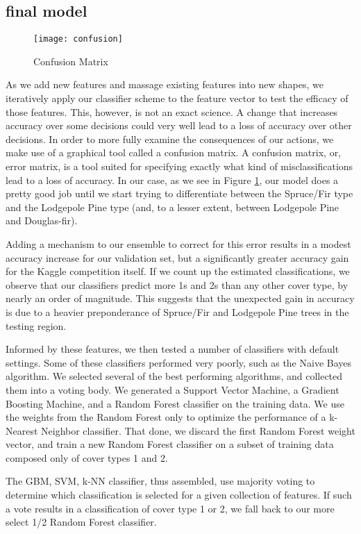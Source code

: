 \subsection{final model}

\begin{figure}[H]
  \texttt{[image: confusion]}
 \caption{Confusion Matrix}
 \label{fig:confusion}
\end{figure}

As we add new features and massage existing features into new shapes, 
we iteratively apply our classifier scheme to the feature vector to 
test the efficacy of those features.  This, however, is not an exact 
science.  A change that increases accuracy over some decisions could 
very well lead to a loss of accuracy over other decisions.  In order to 
more fully examine the consequences of our actions, we make use of a 
graphical tool called a confusion matrix\cite{stehman1997selecting}. A 
confusion matrix, or, error matrix, is a tool suited for specifying 
exactly what kind of misclassifications lead to a loss of accuracy.  
In our case, as we see in Figure \ref{fig:confusion}, our model does a 
pretty good job until we start trying to differentiate between the 
Spruce/Fir type and the Lodgepole Pine type (and, to a lesser extent, 
between Lodgepole Pine and Douglas-fir).  

Adding a mechanism to our ensemble to correct for this error results in 
a modest accuracy increase for our validation set, but a significantly 
greater accuracy gain for the Kaggle competition itself.  If we count 
up the estimated classifications, we observe that our classifiers 
predict more 1s and 2s than any other cover type, by nearly an order of 
magnitude.  This suggests that the unexpected gain in accuracy is due 
to a heavier preponderance of Spruce/Fir and Lodgepole Pine trees in 
the testing region.

Informed by these features, we then tested a number of classifiers with 
default settings.  Some of these classifiers performed very poorly, 
such as the Naive Bayes algorithm.  We selected several of the best 
performing algorithms, and collected them into a voting body.  
We generated a Support Vector Machine, a Gradient Boosting Machine, and 
a Random Forest classifier on the training data.  We use the weights 
from the Random Forest only to optimize the performance of a k-Nearest 
Neighbor classifier.  That done, we discard the first Random Forest 
weight vector, and train a new Random Forest classifier on a subset of 
training data composed only of cover types 1 and 2.

The GBM, SVM, k-NN classifier, thus assembled, use majority voting to 
determine which classification is selected for a given collection of 
features.  If such a vote results in a classification of cover type 1 
or 2, we fall back to our more select 1/2 Random Forest classifier.

